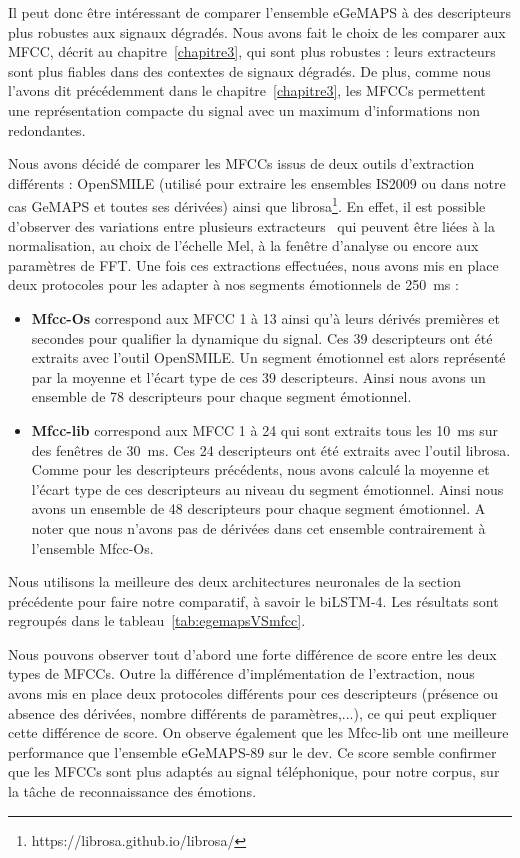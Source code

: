 Il peut donc être intéressant de comparer l'ensemble eGeMAPS à des descripteurs plus robustes aux signaux dégradés. Nous avons fait le choix de les comparer aux MFCC, décrit au chapitre~\ref{chapitre3}, qui sont plus robustes : leurs extracteurs sont plus fiables dans des contextes de signaux dégradés.
De plus, comme nous l'avons dit précédemment dans le chapitre~\ref{chapitre3}, les MFCCs permettent une représentation compacte du signal avec un maximum d'informations non redondantes.

Nous avons décidé de comparer les MFCCs issus de deux outils d'extraction différents : OpenSMILE (utilisé pour extraire les ensembles IS2009 ou dans notre cas GeMAPS et toutes ses dérivées) ainsi que librosa\footnote{https://librosa.github.io/librosa/}. En effet, il est possible d'observer des variations entre plusieurs extracteurs~\cite{Ganchev2005} qui peuvent être liées à la normalisation, au choix de l'échelle Mel, à la fenêtre d'analyse ou encore aux paramètres de FFT. Une fois ces extractions effectuées, nous avons mis en place deux protocoles pour les adapter à nos segments émotionnels de 250~ms :
\begin{itemize}
    \item \textbf{Mfcc-Os} correspond aux MFCC 1 à 13 ainsi qu'à leurs dérivés premières et secondes pour qualifier la dynamique du signal. Ces 39 descripteurs ont été extraits avec l’outil OpenSMILE. Un segment émotionnel est alors représenté par la moyenne et l'écart type de ces 39 descripteurs. Ainsi nous avons un ensemble de 78 descripteurs pour chaque segment émotionnel.
    \item \textbf{Mfcc-lib} correspond aux MFCC 1 à 24 qui sont extraits tous les 10~ms sur des fenêtres de 30~ms. Ces 24 descripteurs ont été extraits avec l'outil librosa. Comme pour les descripteurs précédents, nous avons calculé la moyenne et l'écart type de ces descripteurs au niveau du segment émotionnel. Ainsi nous avons un ensemble de 48 descripteurs pour chaque segment émotionnel. A noter que nous n'avons pas de dérivées dans cet ensemble contrairement à l'ensemble Mfcc-Os.
\end{itemize}

Nous utilisons la meilleure des deux architectures neuronales de la section précédente pour faire notre comparatif, à savoir le biLSTM-4. Les résultats sont regroupés dans le tableau~\ref{tab:egemapsVSmfcc}.



Nous pouvons observer tout d'abord une forte différence de score entre les deux types de MFCCs. Outre la différence d'implémentation de l'extraction, nous avons mis en place deux protocoles différents pour ces descripteurs (présence ou absence des dérivées, nombre différents de paramètres,...), ce qui peut expliquer cette différence de score. On observe également que les Mfcc-lib ont une meilleure performance que l'ensemble eGeMAPS-89 sur le dev. Ce score semble confirmer que les MFCCs sont plus adaptés au signal téléphonique, pour notre corpus, sur la tâche de reconnaissance des émotions.


